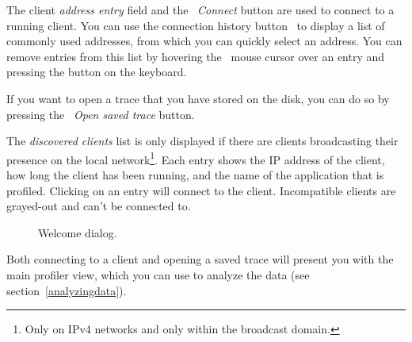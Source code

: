 \documentclass[hidelinks,titlepage,a4paper]{article}
\begin{document}
The client \emph{address entry} field and the \faWifi{}~\emph{Connect} button are used to connect to a running client. You can use the connection history button~\faCaretDown{} to display a list of commonly used addresses, from which you can quickly select an address. You can remove entries from this list by hovering the \faMousePointer{}~mouse cursor over an entry and pressing the \keys{\del} button on the keyboard.

If you want to open a trace that you have stored on the disk, you can do so by pressing the \faFolderOpen{}~\emph{Open saved trace} button.

The \emph{discovered clients} list is only displayed if there are clients broadcasting their presence on the local network\footnote{Only on IPv4 networks and only within the broadcast domain.}. Each entry shows the IP address of the client, how long the client has been running, and the name of the application that is profiled. Clicking on an entry will connect to the client. Incompatible clients are grayed-out and can't be connected to.

\begin{figure}[h]
\centering{}
\caption{Welcome dialog.}
\label{welcomedialog}
\end{figure}

Both connecting to a client and opening a saved trace will present you with the main profiler view, which you can use to analyze the data (see section~\ref{analyzingdata}).
\end{document}
